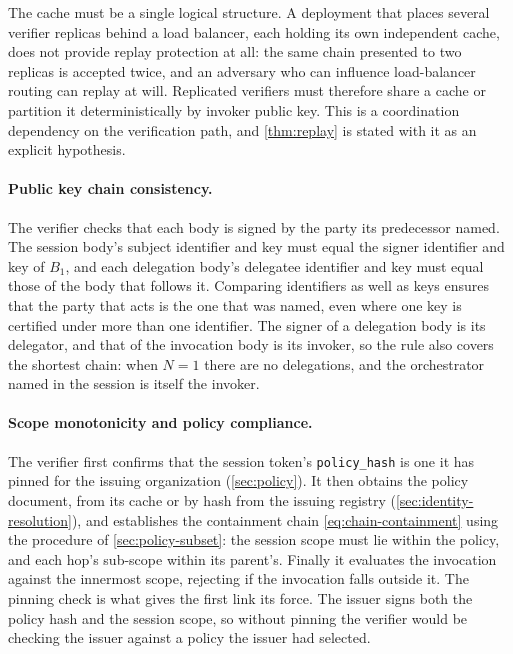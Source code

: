 \documentclass[11pt,a4paper]{article}
\begin{document}
The cache must be a single logical structure. A deployment that places
several verifier replicas behind a load balancer, each holding its own
independent cache, does not provide replay protection at all: the same
chain presented to two replicas is accepted twice, and an adversary who
can influence load-balancer routing can replay at will. Replicated
verifiers must therefore share a cache or partition it deterministically
by invoker public key. This is a coordination dependency on the
verification path, and \cref{thm:replay} is stated with it as an
explicit hypothesis.

\paragraph{Public key chain consistency.}
The verifier checks that each body is signed by the party its
predecessor named. The session body's subject identifier and key must
equal the signer identifier and key of $B_1$, and each delegation body's
delegatee identifier and key must equal those of the body that follows
it. Comparing identifiers as well as keys ensures that the party that
acts is the one that was named, even where one key is certified under
more than one identifier. The signer of a delegation body is its
delegator, and that of the invocation body is its invoker, so the rule
also covers the shortest chain: when $N = 1$
there are no delegations, and the orchestrator named in the session is
itself the invoker.

\paragraph{Scope monotonicity and policy compliance.}
The verifier first confirms that the session token's
\texttt{policy\_hash} is one it has pinned for the issuing organization
(\cref{sec:policy}). It then obtains the policy document, from its cache
or by hash from the issuing registry (\cref{sec:identity-resolution}),
and establishes the containment chain \cref{eq:chain-containment} using
the procedure of \cref{sec:policy-subset}: the session scope must lie
within the policy, and each hop's sub-scope within its parent's. Finally
it evaluates the invocation against the innermost scope, rejecting if
the invocation falls outside it. The pinning check is what gives the
first link its force. The issuer signs both the policy hash and the
session scope, so without pinning the verifier would be checking the
issuer against a policy the issuer had selected.
\end{document}
